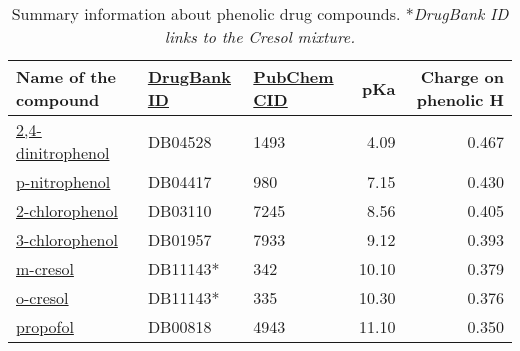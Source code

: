 \documentclass[oneside]{memoir}
\begin{document}
\begin{table}
\renewcommand\thetable{1}
\begin{tabular}{lllrr}
\toprule
\textbf{Name of the compound} & \textbf{\href{https://www.drugbank.ca/}{DrugBank ID}} & \textbf{\href{https://pubchem.ncbi.nlm.nih.gov/}{PubChem CID}} & \textbf{pKa} & \textbf{Charge on phenolic H}\\
\midrule
\href{https://en.wikipedia.org/wiki/2,4-Dinitrophenol}{2,4-dinitrophenol} &
DB04528 &
1493 &
4.09 &
0.467 \\
\href{https://en.wikipedia.org/wiki/4-Nitrophenol}{p-nitrophenol} &
DB04417 &
980 &
7.15 &
0.430 \\
\href{https://en.wikipedia.org/wiki/2-Chlorophenol}{2-chlorophenol} &
DB03110 &
7245 &
8.56 &
0.405 \\
\href{https://en.wikipedia.org/wiki/3-Chlorophenol}{3-chlorophenol} &
DB01957 &
7933 &
9.12 &
0.393 \\
\href{https://en.wikipedia.org/wiki/M-Cresol}{m-cresol} &
DB11143* &
342 &
10.10 &
0.379 \\
\href{https://en.wikipedia.org/wiki/O-Cresol}{o-cresol} &
DB11143*&
335 &
10.30 &
0.376 \\
\href{https://en.wikipedia.org/wiki/Propofol}{propofol} &
DB00818 &
4943 &
11.10 &
0.350 \\
\bottomrule
\end{tabular}

\caption{Summary information about phenolic drug compounds. *\textit{DrugBank ID links to the Cresol mixture.}}


\end{table}
\end{document}

